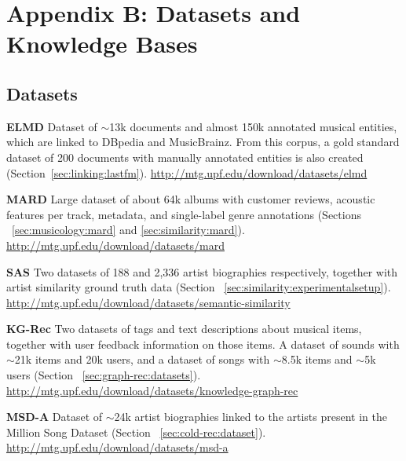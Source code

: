 
\chapter{Appendix B: Datasets and Knowledge Bases}
\label{appendix:datasets}

\section{Datasets}
\label{appendix:datasets:datasets}

\noindent \textbf{ELMD} Dataset of $\sim$13k documents and almost 150k annotated musical entities, which are linked to DBpedia and MusicBrainz. From this corpus, a gold standard dataset of 200 documents with manually annotated entities is also created (Section~\ref{sec:linking:lastfm}). \url{http://mtg.upf.edu/download/datasets/elmd}

\vspace{0.2cm}

\noindent \textbf{MARD} Large dataset of about 64k albums with customer reviews, acoustic features per track, metadata, and single-label genre annotations (Sections ~\ref{sec:musicology:mard} and \ref{sec:similarity:mard}). \url{http://mtg.upf.edu/download/datasets/mard}

\vspace{0.2cm}

\noindent \textbf{SAS} Two datasets of 188 and 2,336 artist biographies respectively, together with artist similarity ground truth data (Section ~\ref{sec:similarity:experimentalsetup}). \url{http://mtg.upf.edu/download/datasets/semantic-similarity}

\vspace{0.2cm}

\noindent \textbf{KG-Rec} Two datasets of tags and text descriptions about musical items, together with user feedback information on those items. A dataset of sounds with $\sim$21k items and 20k users, and a dataset of songs with $\sim$8.5k items and $\sim$5k users (Section ~\ref{sec:graph-rec:datasets}). \url{http://mtg.upf.edu/download/datasets/knowledge-graph-rec}

\vspace{0.2cm}

\noindent \textbf{MSD-A} Dataset of $\sim$24k artist biographies linked to the artists present in the Million Song Dataset (Section ~\ref{sec:cold-rec:dataset}). \url{http://mtg.upf.edu/download/datasets/msd-a}

